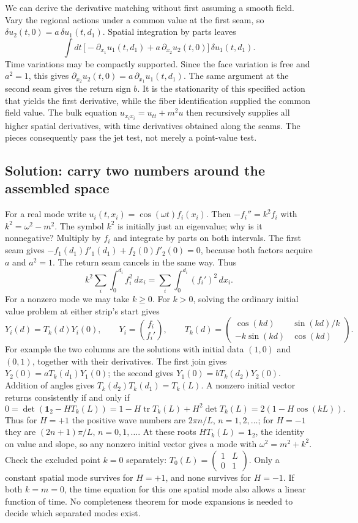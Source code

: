 We can derive the derivative matching without first assuming a smooth field. Vary the regional actions under a common value at the first seam, so $\delta u_2(t,0)=a\,\delta u_1(t,d_1)$. Spatial integration by parts leaves
\[
 \int dt\,\big[-\partial_{x_1}u_1(t,d_1)+a\,\partial_{x_2}u_2(t,0)\big]\,\delta u_1(t,d_1).
\]
Time variations may be compactly supported. Since the face variation is free and $a^2=1$, this gives $\partial_{x_2}u_2(t,0)=a\,\partial_{x_1}u_1(t,d_1)$. The same argument at the second seam gives the return sign $b$. It is the stationarity of this specified action that yields the first derivative, while the fiber identification supplied the common field value. The bulk equation $u_{x_i x_i}=u_{tt}+m^2u$ then recursively supplies all higher spatial derivatives, with time derivatives obtained along the seams. The pieces consequently pass the jet test, not merely a point-value test.

\subsection{Solution: carry two numbers around the assembled space}
For a real mode write $u_i(t,x_i)=\cos(\omega t) f_i(x_i)$. Then $-f_i''=k^2 f_i$ with $k^2=\omega^2-m^2$. The symbol $k^2$ is initially just an eigenvalue; why is it nonnegative? Multiply by $f_i$ and integrate by parts on both intervals. The first seam gives $-f_1(d_1)f'_1(d_1)+f_2(0)f'_2(0)=0$, because both factors acquire $a$ and $a^2=1$. The return seam cancels in the same way. Thus
\[
 k^2\sum_i\int_0^{d_i} f_i^2\,dx_i=\sum_i\int_0^{d_i}(f_i')^2\,dx_i .
\]
For a nonzero mode we may take $k\geq0$. For $k>0$, solving the ordinary initial value problem at either strip's start gives
\[
 Y_i(d)=T_k(d)Y_i(0),\qquad Y_i=\binom{f_i}{f_i'},\qquad
 T_k(d)=\begin{pmatrix}\cos(kd)&\sin(kd)/k\\-k\sin(kd)&\cos(kd)\end{pmatrix}.
\]
For example the two columns are the solutions with initial data $(1,0)$ and $(0,1)$, together with their derivatives. The first join gives $Y_2(0)=a T_k(d_1)Y_1(0)$; the second gives $Y_1(0)=b T_k(d_2)Y_2(0)$. Addition of angles gives $T_k(d_2)T_k(d_1)=T_k(L)$. A nonzero initial vector returns consistently if and only if
\[
 0=\det(\mathbf{1}_2-H T_k(L))=1-H\operatorname{tr}T_k(L)+H^2\det T_k(L)
   =2(1-H\cos(kL)).
\]
Thus for $H=+1$ the positive wave numbers are $2\pi n/L$, $n=1,2,\ldots$; for $H=-1$ they are $(2n+1)\pi/L$, $n=0,1,\ldots$. At these roots $H T_k(L)=\mathbf{1}_2$, the identity on value and slope, so any nonzero initial vector gives a mode with $\omega^2=m^2+k^2$. Check the excluded point $k=0$ separately: $T_0(L)=\left(\begin{smallmatrix}1&L\\0&1\end{smallmatrix}\right)$. Only a constant spatial mode survives for $H=+1$, and none survives for $H=-1$. If both $k=m=0$, the time equation for this one spatial mode also allows a linear function of time. No completeness theorem for mode expansions is needed to decide which separated modes exist.

